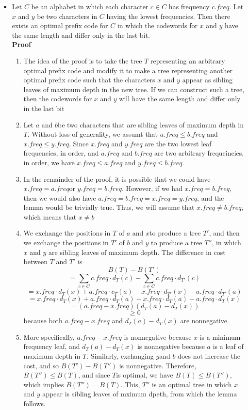 \documentclass{report}
\begin{document}
\begin{itemize}
    \item Let $C$ be an alphabet in which each character $c \in C$ has frequency $c.freq$. Let $x$ and $y$ be two characters in $C$ having the lowest frequencies. Then there exists an optimal prefix code for $C$ in which the codewords for $x$ and $y$ have the same length and differ only in the last bit. \\
    \textbf{Proof}
    \begin{enumerate}
        \item The idea of the proof is to take the tree $T$ representing an arbitrary optimal prefix code and modify it to make a tree representing another optimal prefix code such that the characters $x$ and $y$ appear as sibling leaves of maximum depth in the new tree. If we can construct such a tree, then the codewords for $x$ and $y$ will have the same length and differ only in the last bit
        \item Let $a$ and $b$be two characters that are sibling leaves of maximum depth in $T$. Without loss of generality, we assumt that $a.freq \leq b.freq$ and $x.freq \leq y.freq$. Since $x.freq$ and $y.freq$ are the two lowest leaf frequencies, in order, and $a.freq$ and $b.freq$ are two arbitrary frequeincies, in order, we have $x.freq \leq a.freq$ and $y.freq \leq b.freq$.
        \item In the remainder of the proof, it is possible that we could have $x.freq = a.freq$or $y.freq = b.freq$. However, if we had $x.freq = b.freq$, then we would also have $a.freq = b.freq = x.freq = y.freq$, and the lemma would be trivially true. Thus, we will assume that $x.freq \neq b.freq$, which means that $x \neq b$
        \item We exchange the positions in $T$ of $a$ and $x$to produce a tree $T'$, and then we exchange the positions in $T'$ of $b$ and $y$ to produce a tree $T''$, in which $x$ and $y$ are sibling leaves of maximum depth. The difference in cost between $T$ and $T'$ is
        $$B(T) - B(T')$$
        $$ = \sum_{c \in C} c.freq \cdot d_T(c) - \sum_{c \in C} c.freq \cdot d_{T'} (c)$$
        $$ = x.freq \cdot d_T(x) + a.freq \cdot c_T(a) - x.freq \cdot d_{T'}(x) - a.freq \cdot d_{T'}(a)$$
        $$ = x.freq \cdot d_T(x) + a.freq \cdot d_T(a) - x.freq \cdot d_T(a) - a.freq \cdot d_T(x)$$
        $$ = (a.freq - x.freq)(d_T(a) - d_T(x))$$
        $$ \geq 0$$
        because both $a.freq - x.freq$ and $d_T(a) - d_T(x)$ are nonnegative.
        \item More specifically, $a.freq - x.freq$ is nonnegative because $x$ is a minimum-frequency leaf, and $d_T(a) - d_T(x)$ is nonnegative because $a$ is a leaf of maximum depth in $T$. Similarly, exchanging $y$and $b$ does not increase the cost, and so $B(T') - B(T'')$ is nonnegative. Therefore, $B(T'') \leq B(T)$, and since $T$is optimal, we have $B(T) \leq B(T'')$, which implies $B(T'') = B(T)$. This, $T''$ is an optimal tree in which $x$ and $y$ appear is sibling leaves of mximum dpeth, from which the lemma follows.

\end{enumerate}
\end{itemize}
\end{document}
